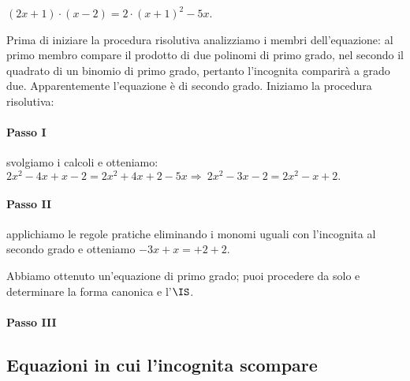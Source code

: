 \begin{exrig}\vspace{1.10ex}
 \begin{esempio}

$(2x+1)\cdot (x-2)=2\cdot (x+1)^{2}-5x$.

Prima di iniziare la procedura risolutiva analizziamo i membri
dell'equazione: al primo membro compare il prodotto
di due polinomi di primo grado, nel secondo il quadrato di un binomio
di primo grado, pertanto l'incognita comparirà a grado due. Apparentemente
l'equazione è di secondo grado. Iniziamo la procedura
risolutiva:

\paragraph{Passo I} svolgiamo i calcoli e otteniamo:
$2x^{2}-4x+x-2=2x^{2}+4x+2-5x\Rightarrow~2x^{2}-3x-2=2x^{2}-x+2.$

\paragraph{Passo II} applichiamo le regole pratiche eliminando i monomi
uguali con l'incognita al secondo grado e otteniamo
$-3x+x=+2+2$.

Abbiamo ottenuto un'equazione di primo grado; puoi
procedere da solo e determinare la forma canonica e l'$\IS$.

\paragraph{Passo III} \dotfill

 \end{esempio}

\end{exrig}


\subsection{Equazioni in cui l'incognita scompare}

